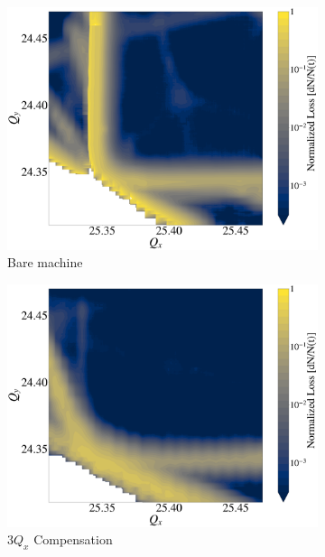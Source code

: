 \newpage
\begin{figure}[H]

    \centering
    \begin{subfigure}{.49\textwidth}
      \includegraphics[width=0.98\linewidth]{chapter4/bare.png}
      \caption{Bare machine}
      \label{fig:sfig1}
    \end{subfigure}%
    \hfill
    \begin{subfigure}{.49\textwidth}
      \includegraphics[width=0.98\linewidth]{chapter4/3qx.png}
      \caption{$3Q_x$ Compensation}
      \label{fig:sfig2}
    \end{subfigure}
    \hfill
    \begin{subfigure}{.49\textwidth}

\end{subfigure}
\end{figure}
